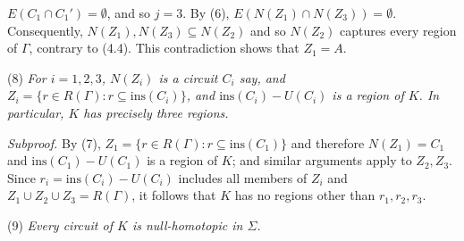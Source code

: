 \noindent $E(C_1 \cap C_1') = \emptyset$, and so $j = 3$. By (6), $E(N(Z_1) \cap N(Z_3)) = \emptyset$. Consequently, $N(Z_1), N(Z_3) \subseteq N(Z_2)$ and so $N(Z_2)$ captures every region of $\Gamma$, contrary to (4.4). This contradiction shows that $Z_1 = A$.

\hspace*{12pt}(8) \textit{For $i = 1, 2, 3$, $N(Z_i)$ is a circuit $C_i$ say, and $Z_i = \{r \in R(\Gamma) : r \subseteq \text{ins}(C_i)\}$, and $\text{ins}(C_i) - U(C_i)$ is a region of $K$. In particular, $K$ has precisely three regions.}

\textit{Subproof.} By (7), $Z_1 = \{r \in R(\Gamma) : r \subseteq \text{ins}(C_1)\}$ and therefore $N(Z_1) = C_1$ and $\text{ins}(C_1) - U(C_1)$ is a region of $K$; and similar arguments apply to $Z_2, Z_3$. Since $r_i = \text{ins}(C_i) - U(C_i)$ includes all members of $Z_i$ and $Z_1 \cup Z_2 \cup Z_3 = R(\Gamma)$, it follows that $K$ has no regions other than $r_1, r_2, r_3$.

\hspace*{12pt}(9) \textit{Every circuit of $K$ is null-homotopic in $\Sigma$.}

